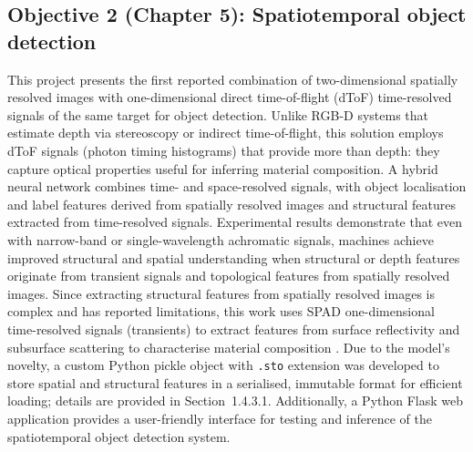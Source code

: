 \documentclass[12pt,a4paper,oneside]{report}
\begin{document}
\subsection{Objective 2 (Chapter 5): Spatiotemporal object detection}
This project presents the first reported combination of two-dimensional spatially resolved images with one-dimensional direct time-of-flight (dToF) time-resolved signals of the same target for object detection. Unlike RGB-D systems that estimate depth via stereoscopy or indirect time-of-flight, this solution employs dToF signals (photon timing histograms) that provide more than depth: they capture optical properties useful for inferring material composition. A hybrid neural network combines time- and space-resolved signals, with object localisation and label features derived from spatially resolved images and structural features extracted from time-resolved signals. Experimental results demonstrate that even with narrow-band or single-wavelength achromatic signals, machines achieve improved structural and spatial understanding when structural or depth features originate from transient signals and topological features from spatially resolved images. Since extracting structural features from spatially resolved images is complex and has reported limitations, this work uses SPAD one-dimensional time-resolved signals (transients) to extract features from surface reflectivity and subsurface scattering to characterise material composition \cite{sharan2013,schwartz2013,yang2024}. Due to the model's novelty, a custom Python pickle object with \texttt{.sto} extension was developed to store spatial and structural features in a serialised, immutable format for efficient loading; details are provided in Section~1.4.3.1. Additionally, a Python Flask web application provides a user-friendly interface for testing and inference of the spatiotemporal object detection system.
\end{document}

